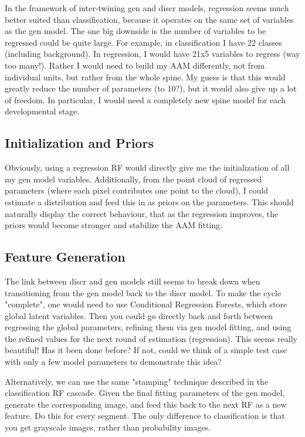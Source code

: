 \documentclass[10pt,twocolumn,letterpaper]{article}
\begin{document}
In the framework of inter-twining gen and discr models, regression seems much better suited than classification, because it operates on the same set of variables as the gen model.  The one big downside is the number of variables to be regressed could be quite large.  For example, in classification I have 22 classes (including background).  In regression, I would have 21x5 variables to regress (way too many!).  Rather I would need to build my AAM differently, not from individual units, but rather from the whole spine.  My guess is that this would greatly reduce the number of parameters (to 10?), but it would also give up a lot of freedom.  In particular, I would need a completely new spine model for each developmental stage.

\subsection{Initialization and Priors}

Obviously, using a regression RF would directly give me the initialization of all my gen model variables.  Additionally, from the point cloud of regressed parameters (where each pixel contributes one point to the cloud), I could estimate a distribution and feed this in as priors on the parameters.  This should naturally display the correct behaviour, that as the regression improves, the priors would become stronger and stabilize the AAM fitting.

\subsection{Feature Generation}

The link between discr and gen models still seems to break down when transitioning from the gen model back to the discr model.  To make the cycle "complete", one would need to use Conditional Regression Forests, which store global latent variables. Then you could go directly back and forth between regressing the global parameters, refining them via gen model fitting, and using the refined values for the next round of estimation (regression).  This seems really beautiful!  Has it been done before?  If not, could we think of a simple test case with only a few model parameters to demonstrate this idea?

Alternatively, we can use the same "stamping" technique described in the classification RF cascade.  Given the final fitting parameters of the gen model, generate the corresponding image, and feed this back to the next RF as a new feature.  Do this for every segment.  The only difference to classification is that you get grayscale images, rather than probability images.
\end{document}
